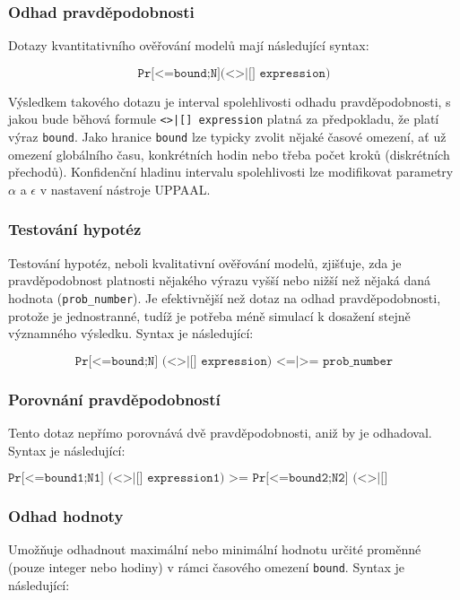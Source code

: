 \subsubsection{Odhad pravděpodobnosti}
Dotazy kvantitativního ověřování modelů mají následující syntax:

\begin{equation*}
    \texttt{Pr[<=bound;N](<>|[] expression)}
\end{equation*}

Výsledkem takového dotazu je interval spolehlivosti odhadu pravděpodobnosti, s jakou bude běhová formule \texttt{<>|[] expression} platná za předpokladu, že platí výraz \texttt{bound}. Jako hranice \texttt{bound} lze typicky zvolit nějaké časové omezení, ať už omezení globálního času, konkrétních hodin nebo třeba počet kroků (diskrétních přechodů). Konfidenční hladinu intervalu spolehlivosti lze modifikovat parametry $\alpha$ a $\epsilon$ v nastavení nástroje UPPAAL.

\subsubsection{Testování hypotéz}
Testování hypotéz, neboli kvalitativní ověřování modelů, zjišťuje, zda je pravděpodobnost platnosti nějakého výrazu vyšší nebo nižší než nějaká daná hodnota (\texttt{prob\_number}). Je efektivnější než dotaz na odhad pravděpodobnosti, protože je jednostranné, tudíž je potřeba méně simulací k dosažení stejně významného výsledku. Syntax je následující:

\begin{equation*}
    \texttt{Pr[<=bound;N] (<>|[] expression) <=|>= prob\_number}
\end{equation*}

\subsubsection{Porovnání pravděpodobností}
Tento dotaz nepřímo porovnává dvě pravděpodobnosti, aniž by je odhadoval. Syntax je následující:

\begin{equation*}
    \texttt{Pr[<=bound1;N1] (<>|[] expression1) >= Pr[<=bound2;N2] (<>|[] expression2)}
\end{equation*}

\subsubsection{Odhad hodnoty}
Umožňuje odhadnout maximální nebo minimální hodnotu určité proměnné (pouze integer nebo hodiny) v rámci časového omezení \texttt{bound}. Syntax je následující:

